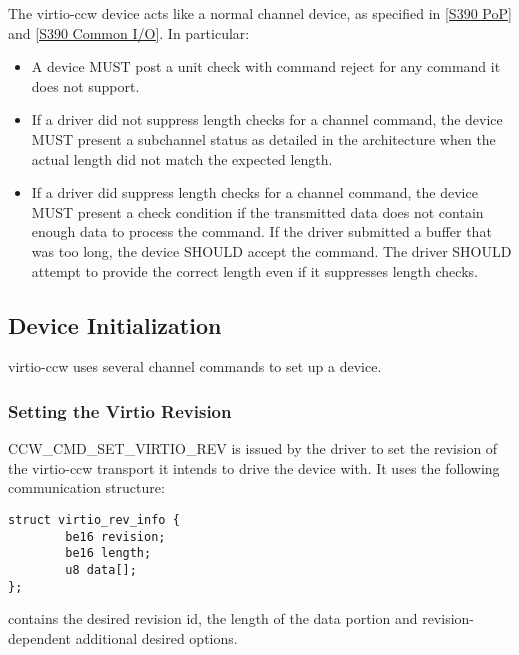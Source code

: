 The virtio-ccw device acts like a normal channel device, as specified
in \hyperref[intro:S390 PoP]{[S390 PoP]} and \hyperref[intro:S390 Common I/O]{[S390 Common I/O]}. In particular:

\begin{itemize}
\item A device MUST post a unit check with command reject for any command
  it does not support.

\item If a driver did not suppress length checks for a channel command,
  the device MUST present a subchannel status as detailed in the
  architecture when the actual length did not match the expected length.

\item If a driver did suppress length checks for a channel command, the
  device MUST present a check condition if the transmitted data does
  not contain enough data to process the command. If the driver submitted
  a buffer that was too long, the device SHOULD accept the command.
  The driver SHOULD attempt to provide the correct length even if it
  suppresses length checks.
\end{itemize}

\subsection{Device Initialization}\label{sec:Virtio Transport Options / Virtio over channel I/O / Device Initialization}

virtio-ccw uses several channel commands to set up a device.

\subsubsection{Setting the Virtio Revision}\label{sec:Virtio Transport Options / Virtio over channel I/O / Device Initialization / Setting the Virtio Revision}

CCW_CMD_SET_VIRTIO_REV is issued by the driver to set the revision of
the virtio-ccw transport it intends to drive the device with. It uses the
following communication structure:

\begin{lstlisting}
struct virtio_rev_info {
        be16 revision;
        be16 length;
        u8 data[];
};
\end{lstlisting}

 contains the desired revision id,  the length of the
data portion and  revision-dependent additional desired options.

